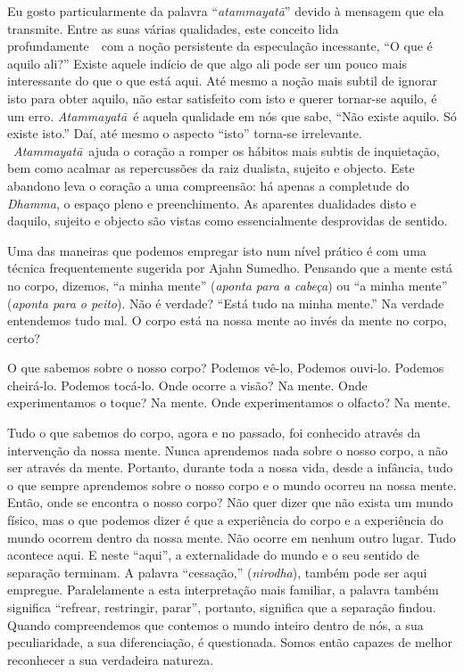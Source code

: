 Eu gosto particularmente da palavra ``\emph{atammayatā}'' devido à
mensagem que ela transmite. Entre as suas várias qualidades, este
conceito lida profundamente~~com a noção persistente da especulação
incessante, ``O que é aquilo ali?'' Existe aquele indício de que algo
ali pode ser um pouco mais interessante do que o que está aqui. Até
mesmo a noção mais subtil de ignorar isto para obter aquilo, não estar
satisfeito com isto e querer tornar-se aquilo, é um erro.
\emph{Atammayatā}~é aquela qualidade em nós que sabe, ``Não existe
aquilo. Só existe isto.'' Daí, até mesmo o aspecto ``isto'' torna-se
irrelevante. ~\emph{Atammayatā}~ajuda o coração a romper os hábitos mais
subtis de inquietação, bem como acalmar as repercussões da raiz
dualista, sujeito e objecto. Este abandono leva o coração a uma
compreensão: há apenas a completude do \emph{Dhamma}, o espaço pleno e
preenchimento. As aparentes dualidades disto e daquilo, sujeito e
objecto são vistas como essencialmente desprovidas de sentido.

Uma das maneiras que podemos empregar isto num nível prático é com uma
técnica frequentemente sugerida por Ajahn Sumedho. Pensando que a mente
está no corpo, dizemos, ``a minha mente'' (\emph{aponta para a cabeça})
ou ``a minha mente'' (\emph{aponta para o peito}). Não é verdade? ``Está
tudo na minha mente.'' Na verdade entendemos tudo mal. O corpo está na
nossa mente ao invés da mente no corpo, certo?

O que sabemos sobre o nosso corpo? Podemos vê-lo, Podemos ouvi-lo.
Podemos cheirá-lo. Podemos tocá-lo. Onde ocorre a visão? Na mente. Onde
experimentamos o toque? Na mente. Onde experimentamos o olfacto? Na
mente.

Tudo o que sabemos do corpo, agora e no passado, foi conhecido através
da intervenção da nossa mente. Nunca aprendemos nada sobre o nosso
corpo, a não ser através da mente. Portanto, durante toda a nossa vida,
desde a infância, tudo o que sempre aprendemos sobre o nosso corpo e o
mundo ocorreu na nossa mente. Então, onde se encontra o nosso corpo? Não
quer dizer que não exista um mundo físico, mas o que podemos dizer é que
a experiência do corpo e a experiência do mundo ocorrem dentro da nossa
mente. Não ocorre em nenhum outro lugar. Tudo acontece aqui. E neste
``aqui'', a externalidade do mundo e o seu sentido de separação
terminam. A palavra ``cessação,'' (\emph{nirodha}), também pode ser aqui
empregue. Paralelamente a esta interpretação mais familiar, a palavra
também significa ``refrear, restringir, parar'', portanto, significa que
a separação findou. Quando compreendemos que contemos o mundo inteiro
dentro de nós, a sua peculiaridade, a sua diferenciação, é questionada.
Somos então capazes de melhor reconhecer a sua verdadeira natureza.~

